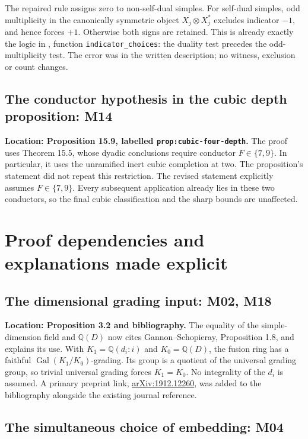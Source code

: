 \documentclass[11pt,a4paper]{article}
\begin{document}
The repaired rule assigns zero to non-self-dual simples. For self-dual
simples, odd multiplicity in the canonically symmetric object
$X_j\otimes X_j^*$ excludes indicator $-1$, and hence forces $+1$.
Otherwise both signs are retained. This is already exactly the logic in
, function \texttt{indicator\_choices}:
the duality test precedes the odd-multiplicity test. The error was in the
written description; no witness, exclusion or count changes.

\subsection{The conductor hypothesis in the cubic depth proposition: M14}

\textbf{Location: Proposition 15.9, labelled
\texttt{prop:cubic-four-depth}.}
The proof uses Theorem 15.5, whose dyadic conclusions require conductor
$F\in\{7,9\}$. In particular, it uses the unramified inert cubic
completion at two. The proposition's statement did not repeat this
restriction. The revised statement explicitly assumes $F\in\{7,9\}$.
Every subsequent application already lies in these two conductors, so
the final cubic classification and the sharp bounds are unaffected.

\section{Proof dependencies and explanations made explicit}

\subsection{The dimensional grading input: M02, M18}

\textbf{Location: Proposition 3.2 and bibliography.}
The equality of the simple-dimension field and $\mathbb Q(D)$ now cites
Gannon--Schopieray, Proposition 1.8, and explains its use. With
$K_1=\mathbb Q(d_i:i)$ and $K_0=\mathbb Q(D)$, the fusion ring has a
faithful $\operatorname{Gal}(K_1/K_0)$-grading. Its group is a quotient
of the universal grading group, so trivial universal grading forces
$K_1=K_0$. No integrality of the $d_i$ is assumed. A primary preprint
link, \href{https://arxiv.org/abs/1912.12260}{arXiv:1912.12260}, was added
to the bibliography alongside the existing journal reference.

\subsection{The simultaneous choice of embedding: M04}
\end{document}
